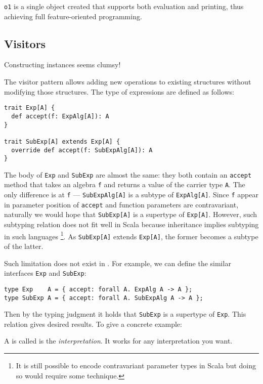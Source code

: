 \lstinline{o1} is a single object created that supports both evaluation and
printing, thus achieving full feature-oriented programming.

\subsection{Visitors}

Constructing instances seems clumsy!

The visitor pattern allows adding new operations to existing structures without
modifying those structures. The type of expressions are defined as follows:

\begin{verbatim}
trait Exp[A] {
  def accept(f: ExpAlg[A]): A
}

trait SubExp[A] extends Exp[A] {
  override def accept(f: SubExpAlg[A]): A
}
\end{verbatim}

The body of \lstinline{Exp} and \lstinline{SubExp} are almost the same: they
both contain an \lstinline{accept} method that takes an algebra \lstinline{f}
and returns a value of the carrier type \lstinline{A}. The only difference is at
\lstinline{f} --- \lstinline{SubExpAlg[A]} is a subtype of
\lstinline{ExpAlg[A]}. Since \lstinline{f} appear in parameter position of
\lstinline{accept} and function parameters are contravariant, naturally we would
hope that \lstinline{SubExp[A]} is a supertype of \lstinline{Exp[A]}. However,
such subtyping relation does not fit well in Scala because inheritance implies
subtyping in such languages \footnote{It is still possible to encode
  contravariant parameter types in Scala but doing so would require some
  technique.}. As \lstinline{SubExp[A]} extends \lstinline{Exp[A]}, the former
becomes a subtype of the latter.

Such limitation does not exist in \name. For example, we can define the similar interfaces \lstinline{Exp} and \lstinline{SubExp}:
\begin{lstlisting}
type Exp    A = { accept: forall A. ExpAlg A -> A };
type SubExp A = { accept: forall A. SubExpAlg A -> A };
\end{lstlisting}
Then by the typing judgment it holds that \lstinline{SubExp} is a supertype of
\lstinline{Exp}. This relation gives desired results. To give a concrete example:

A is called is the \emph{interpretation}. It works for any interpretation you want.


